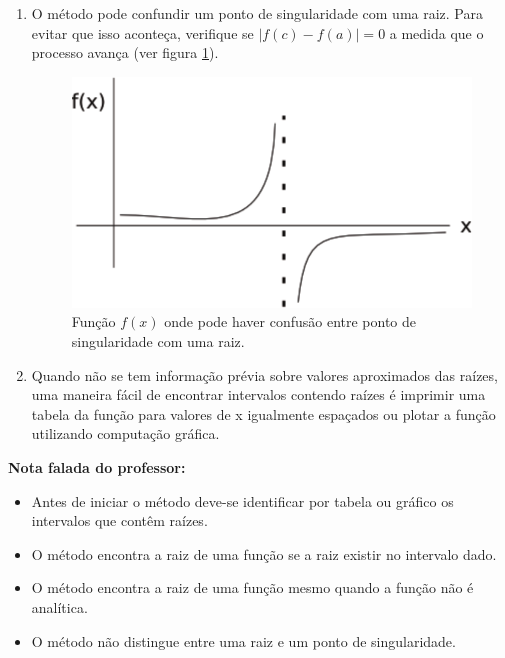 \begin{enumerate}
\item O método pode confundir um ponto de singularidade com uma raiz. Para evitar que isso aconteça, verifique se $|f(c) - f(a)| = 0 $ a medida que o processo avança (ver figura \ref{fig:bissecao4}).

\begin{figure}[htb]
  \setlength{\abovecaptionskip}{20pt}
  \centering
  \includegraphics[scale=0.8]{capitulos/capitulo1/figuras/bissecao4-eps-converted-to.pdf}
  \caption{Função $f(x)$ onde pode haver confusão entre ponto de singularidade com uma raiz.}
  \label{fig:bissecao4}
\end{figure}

\item Quando não se tem informação prévia sobre valores aproximados das raízes, uma maneira fácil de encontrar intervalos contendo raízes é imprimir uma tabela da função para valores de x igualmente espaçados ou plotar a função utilizando computação gráfica.

\end{enumerate}

\textbf{Nota falada do professor:}

\begin{itemize}
 \item Antes de iniciar o método deve-se identificar por tabela ou gráfico os intervalos que contêm raízes.

 \item O método encontra a raiz de uma função se a raiz existir no intervalo dado.

 \item O método encontra a raiz de uma função mesmo quando a função não é analítica.

 \item O método não distingue entre uma raiz e um ponto de singularidade.
\end{itemize}